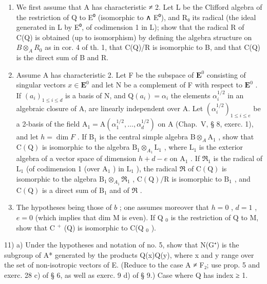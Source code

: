 \begin{enumerate}
\def\labelenumi{\alph{enumi})}
\item
  We first assume that A has characteristic ≠ 2. Let L be the Clifford algebra of the restriction of Q to E⁰ (isomorphic to ∧ E⁰), and R₀ its radical (the ideal generated in L by E⁰, of codimension 1 in L); show that the radical R of C(Q) is obtained (up to isomorphism) by defining the algebra structure on \(B \otimes_{A} R_{0}\) as in cor. 4 of th. 1, that C(Q)/R is isomorphic to B, and that C(Q) is the direct sum of B and R.
\item
  Assume A has characteristic 2. Let F be the subspace of \(\mathbf{E}^0\) consisting of singular vectors \(x \in \mathbf{E}^0\) and let N be a complement of F with respect to \(\mathbf{E}^0\) . If \((a_i)_{1 \leqslant i \leqslant d}\) is a basis of N, and \(\mathrm{Q}(a_i) = \alpha_i\) the elements \(\alpha_i^{1/2}\) in an algebraic closure of A, are linearly independent over A. Let \((\alpha_i^{1/2})_{1 \leqslant i \leqslant e}\) be a 2-basis of the field \(\mathrm{A}_1 = \mathrm{A}(\alpha_1^{1/2}, \ldots, \alpha_d^{1/2})\) on A (Chap.~V, § 8, exerc. 1), and let \(h = \dim F\) . If \(\mathrm{B}_1\) is the central simple algebra \(\mathrm{B} \otimes_{A} \mathrm{A}_1\) , show that \(\mathrm{C(Q)}\) is isomorphic to the algebra \(\mathrm{B}_1 \otimes_{A_1} \mathrm{L}_1\) , where \(\mathrm{L}_1\) is the exterior algebra of a vector space of dimension \(h + d - e\) on \(\mathrm{A}_1\) . If \(\Re_1\) is the radical of \(\mathrm{L}_1\) (of codimension 1 (over \(\mathrm{A}_1\) ) in \(\mathrm{L}_1\) ), the radical \(\Re\) of \(\mathrm{C(Q)}\) is isomorphic to the algebra \(\mathrm{B}_1 \otimes_{A_1} \Re_1\) , \(\mathrm{C(Q)/R}\) is isomorphic to \(\mathrm{B}_1\) , and \(\mathrm{C(Q)}\) is a direct sum of \(\mathrm{B}_1\) and of \(\Re\) .
\item
  The hypotheses being those of \(b\) ; one assumes moreover that \(h=0\) , \(d=1\) , \(e=0\) (which implies that dim M is even). If Q \(_{0}\) is the restriction of Q to M, show that C \(^{+}\) (Q) is isomorphic to C(Q \(_{0}\) ).
\end{enumerate}

11) a) Under the hypotheses and notation of no. 5, show that N(G⁺) is the subgroup of A* generated by the products Q(x)Q(y), where x and y range over the set of non-isotropic vectors of E. (Reduce to the case A ≠ F₂; use prop. 5 and exerc. 28 c) of § 6, as well as exerc. 9 d) of § 9.) Case where Q has index ≥ 1.

